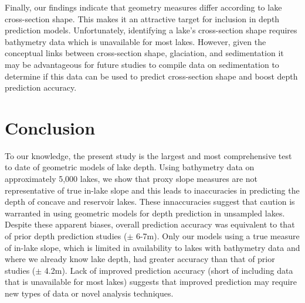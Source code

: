 \documentclass[draft]{agujournal2019}
\begin{document}
Finally, our findings indicate that geometry measures differ according to lake cross-section shape. This makes it an attractive target for inclusion in depth prediction models. Unfortunately, identifying a lake’s cross-section shape requires bathymetry data which is unavailable for most lakes. However, given the conceptual links between cross-section shape, glaciation, and sedimentation \cite{johanssonNewApproachesModelling2007} it may be advantageous for future studies to compile data on sedimentation to determine if this data can be used to predict cross-section shape and boost depth prediction accuracy.

\section{Conclusion}
\noindent
To our knowledge, the present study is the largest and most comprehensive test to date of geometric models of lake depth. Using bathymetry data on approximately 5,000 lakes, we show that proxy slope measures are not representative of true in-lake slope and this leads to inaccuracies in predicting the depth of concave and reservoir lakes. These innaccuracies suggest that caution is warranted in using geometric models for depth prediction in unsampled lakes. Despite these apparent biases, overall prediction accuracy was equivalent to that of prior depth prediction studies ($\pm$ 6-7m). Only our models using a true measure of in-lake slope, which is limited in availability to lakes with bathymetry data and where we already know lake depth, had greater accuracy than that of prior studies ($\pm$ 4.2m). Lack of improved prediction accuracy (short of including data that is unavailable for most lakes) suggests that improved prediction may require new types of data or novel analysis techniques.


%
%
%
%
%
%
%
%
%
%
\end{document}
